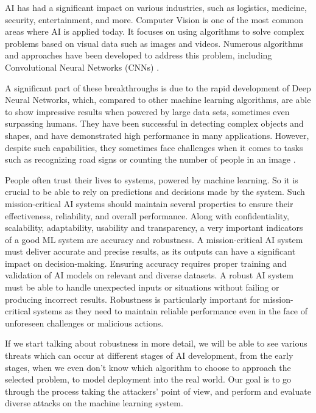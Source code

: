 \documentclass[14pt,a4paper]{extarticle}
\newcounter{e}
\numberwithin{equation}{section}
\numberwithin{figure}{section}
\begin{document}
AI has had a significant impact on various industries, such as logistics, medicine, security, entertainment, and more. Computer Vision is one of the most common areas where AI is applied today. It focuses on using algorithms to solve complex problems based on visual data such as images and videos. Numerous algorithms and approaches have been developed to address this problem, including Convolutional Neural Networks (CNNs) \cite{overview}.

A significant part of these breakthroughs is due to the rapid development of Deep Neural Networks, which, compared to other machine learning algorithms, are able to show impressive results when powered by large data sets, sometimes even surpassing humans. They have been successful in detecting complex objects and shapes, and have demonstrated high performance in many applications. However, despite such capabilities, they sometimes face challenges when it comes to tasks such as recognizing road signs or counting the number of people in an image \cite{od-overview}.

People often trust their lives to systems, powered by machine learning. So it is crucial to be able to rely on predictions and decisions made by the system. Such mission-critical AI systems should maintain several properties to ensure their effectiveness, reliability, and overall performance. Along with confidentiality, scalability, adaptability, usability and transparency, a very important indicators of a good ML system are accuracy and robustness. A mission-critical AI system must deliver accurate and precise results, as its outputs can have a significant impact on decision-making. Ensuring accuracy requires proper training and validation of AI models on relevant and diverse datasets. A robust AI system must be able to handle unexpected inputs or situations without failing or producing incorrect results. Robustness is particularly important for mission-critical systems as they need to maintain reliable performance even in the face of unforeseen challenges or malicious actions.

If we start talking about robustness in more detail, we will be able to see various threats which can occur at different stages of AI development, from the early stages, when we even don't know which algorithm to choose to approach the selected problem, to model deployment into the real world. Our goal is to go through the process taking the attackers' point of view, and perform and evaluate diverse attacks on the machine learning system.
\end{document}
